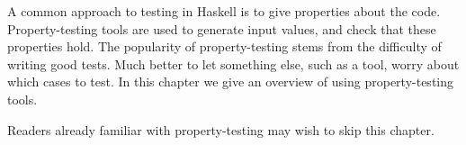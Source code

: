 A common approach to testing in Haskell is to give properties about the code.
Property-testing tools are used to generate input values, and check that these
properties hold.  The popularity of property-testing stems from the difficulty
of writing good tests.  Much better to let something else, such as a tool, worry
about which cases to test.  In this chapter we give an overview of using
property-testing tools.

Readers already familiar with property-testing may wish to skip this chapter.
